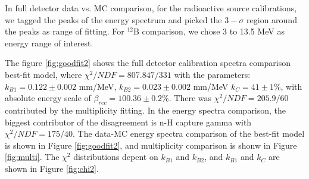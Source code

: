 

In full detector data vs. MC comparison, for the radioactive source calibrations, we tagged the peaks of the energy spectrum and picked the $3-\sigma$ region around the peaks as range of fitting. 
For $^{12}$B comparison, we chose 3 to 13.5 MeV as energy range of interest.

The figure \ref{fig:goodfit2} shows the full detector calibration spectra comparison best-fit model, where $\chi^2/NDF = 807.847/331$ with the parameters: $k_{B1} = 0.122 \pm 0.002$ mm/MeV, $k_{B2} = 0.023 \pm 0.002$ mm/MeV $k_C = 41 \pm 1\%$, with absolute energy scale of $\beta_{rec} = 100.36\pm0.2\%$. 
There was $\chi^2/NDF = 205.9/60$ contributed by the multiplicity fitting.
In the energy spectra comparison, the biggest contributor of the disagreement is n-H capture gamma with $\chi^2/NDF = 175/40$.
The data-MC energy spectra comparison of the best-fit model is shown in Figure \ref{fig:goodfit2}, and multiplicity comparison is shonw in Figure \ref{fig:multi}.
The $\chi^2$ distributions depent on $k_{B1}$ and $k_{B2}$, and $k_{B1}$ and $k_{C}$ are shown in Figure \ref{fig:chi2}.

